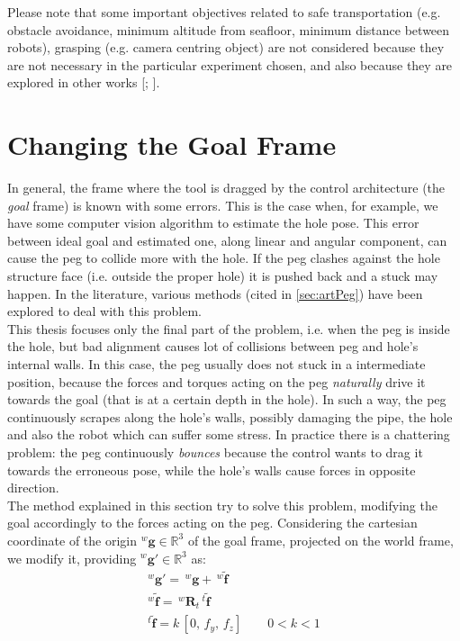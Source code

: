 Please note that some important objectives related to safe transportation (e.g. obstacle avoidance, minimum altitude from seafloor, minimum distance between robots), grasping (e.g. camera centring object) are not considered because they are not necessary in the particular experiment chosen, and also because they are explored in other works [\cite{IntroMaris2}; \cite{IntroRecent}].\\


\section{Changing the Goal Frame}
\label{sec:changeGoal}
In general, the frame where the tool is dragged by the control architecture (the \textit{goal} frame) is known with some errors. This is the case when, for example, we have some computer vision algorithm to estimate the hole pose. 
This error between ideal goal and estimated one, along linear and angular component, can cause the peg to collide more with the hole. If the peg clashes against the hole structure face (i.e. outside the proper hole) it is pushed back and a stuck may happen. In the literature, various methods (cited in \ref{sec:artPeg}) have been explored to deal with this problem.\\
This thesis focuses only the final part of the problem, i.e. when the peg is inside the hole, but bad alignment causes lot of collisions between peg and hole's internal walls. In this case, the peg usually does not stuck in a intermediate position, because the forces and torques acting on the peg \textit{naturally} drive it towards the goal (that is at a certain depth in the hole). In such a way, the peg continuously scrapes along the hole's walls, possibly damaging the pipe, the hole and also the robot which can suffer some stress. In practice there is a chattering problem: the peg continuously \textit{bounces} 
because the control wants to drag it towards the erroneous pose, while the hole's walls cause forces in opposite direction.\\
The method explained in this section try to solve this problem, modifying the goal accordingly to the forces acting on the peg. Considering the cartesian coordinate of the origin $^{w}\boldsymbol{g} \in \mathbb{R}^{3}$ of the goal frame, projected on the world frame, we modify it, providing $^{w}\boldsymbol{g'} \in \mathbb{R}^{3}$ as:
\begin{equation}
	\label{eq:changeGoal}
	\begin{gathered}
	^{w}\boldsymbol{g'} = \,^{w}\boldsymbol{g} + \, ^{w}\boldsymbol{\tilde{f}} \\
	 ^{w}\boldsymbol{\tilde{f}} =  \,^{w}\boldsymbol{R}_t \,^{t}\boldsymbol{\tilde{f}} \\
	 ^{t}\boldsymbol{\tilde{f}} = k \, [ 0, \, f_y, \, f_z ] \qquad 0 < k < 1
%
	 \end{gathered}
\end{equation}
